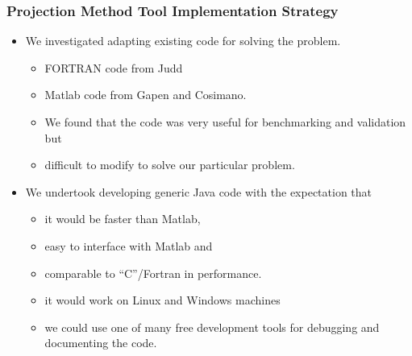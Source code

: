 \documentclass[handout]{beamer}
\begin{document}
\begin{frame}
  \frametitle{Projection Method Tool Implementation Strategy}

\begin{itemize}
\item We investigated adapting existing code for solving the problem.
  \begin{itemize}
\item FORTRAN code from Judd 
\item  Matlab code from Gapen and Cosimano. 
\item We found that the code was very useful for benchmarking and validation but \item difficult to modify to solve our particular problem.
\end{itemize}
  \end{itemize}

\begin{itemize}
\item We undertook developing generic Java code with the expectation that 
  \begin{itemize}
  \item 
it would be faster than Matlab,
\item easy to interface with Matlab and
\item  comparable to ``C''/Fortran in performance.
\item it would work on Linux and Windows machines
\item we could use one of many free development tools 
for debugging and documenting the code.
  \end{itemize}
\end{itemize}



\end{frame}

  
\end{document}
